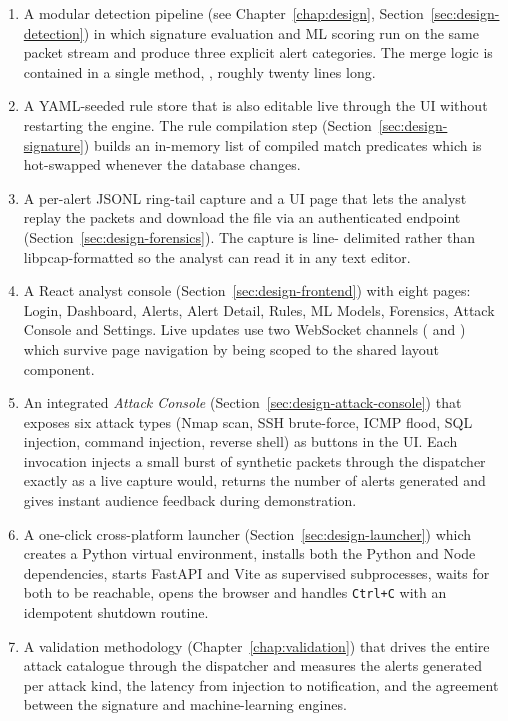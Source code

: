 \begin{enumerate}
  \item A modular detection pipeline (see Chapter~\ref{chap:design},
        Section~\ref{sec:design-detection}) in which signature
        evaluation and ML scoring run on the same packet stream and
        produce three explicit alert categories. The merge logic is
        contained in a single method, ,
        roughly twenty lines long.
  \item A YAML-seeded rule store that is also editable live through
        the UI without restarting the engine. The rule compilation
        step (Section~\ref{sec:design-signature}) builds an in-memory
        list of compiled match predicates which is hot-swapped whenever
        the database changes.
  \item A per-alert JSONL ring-tail capture and a UI page that lets the
        analyst replay the packets and download the file via an
        authenticated endpoint
        (Section~\ref{sec:design-forensics}). The capture is line-
        delimited rather than libpcap-formatted so the analyst can read
        it in any text editor.
  \item A React analyst console
        (Section~\ref{sec:design-frontend}) with eight pages: Login,
        Dashboard, Alerts, Alert Detail, Rules, ML Models, Forensics,
        Attack Console and Settings. Live updates use two WebSocket
        channels ( and ) which
        survive page navigation by being scoped to the shared layout
        component.
  \item An integrated \emph{Attack Console}
        (Section~\ref{sec:design-attack-console}) that exposes six
        attack types (Nmap scan, SSH brute-force, ICMP flood, SQL
        injection, command injection, reverse shell) as buttons in the
        UI. Each invocation injects a small burst of synthetic packets
        through the dispatcher exactly as a live capture would, returns
        the number of alerts generated and gives instant audience
        feedback during demonstration.
  \item A one-click cross-platform launcher
        (Section~\ref{sec:design-launcher}) which creates a Python
        virtual environment, installs both the Python and Node
        dependencies, starts FastAPI and Vite as supervised
        subprocesses, waits for both to be reachable, opens the browser
        and handles \verb|Ctrl+C| with an idempotent shutdown routine.
  \item A validation methodology (Chapter~\ref{chap:validation})
        that drives the entire attack catalogue through the
        dispatcher and measures the alerts generated per attack
        kind, the latency from injection to notification, and the
        agreement between the signature and machine-learning
        engines.
\end{enumerate}

